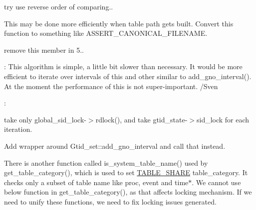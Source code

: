 \begin{DoxyRefList}
try use reverse order of comparing.. 
\item[\label{todo__todo000020}%
\Hypertarget{todo__todo000020}%
Member \mbox{\hyperlink{handler_8cc_ad012444cc24f2178ff92e9e7ecbfbc85}{get\+\_\+canonical\+\_\+filename}} (handler $\ast$file, const char $\ast$path, char $\ast$tmp\+\_\+path)]This may be done more efficiently when table path gets built. Convert this function to something like A\+S\+S\+E\+R\+T\+\_\+\+C\+A\+N\+O\+N\+I\+C\+A\+L\+\_\+\+F\+I\+L\+E\+N\+A\+ME.  
\item[\label{todo__todo000130}%
\Hypertarget{todo__todo000130}%
Member \mbox{\hyperlink{structGRANT__INFO_afb32946497f7754ba60914d9fca5d616}{G\+R\+A\+N\+T\+\_\+\+I\+N\+FO\+:\+:want\+\_\+privilege}} ]remove this member in 5..  
\item[\label{todo__todo000060}%
\Hypertarget{todo__todo000060}%
Member \mbox{\hyperlink{classGtid__set_a9a384be7c735d018d5fc0c8c0c64344e}{Gtid\+\_\+set\+:\+:intersection}} (const \mbox{\hyperlink{classGtid__set}{Gtid\+\_\+set}} $\ast$other, \mbox{\hyperlink{classGtid__set}{Gtid\+\_\+set}} $\ast$result)]\+: This algorithm is simple, a little bit slower than necessary. It would be more efficient to iterate over intervals of \textquotesingle{}this\textquotesingle{} and \textquotesingle{}other\textquotesingle{} similar to add\+\_\+gno\+\_\+interval(). At the moment the performance of this is not super-\/important. /\+Sven  
\item[\label{todo__todo000059}%
\Hypertarget{todo__todo000059}%
Member \mbox{\hyperlink{classGtid__table__persistor_aeea3284db6daf718fa412a70e4afb889}{Gtid\+\_\+table\+\_\+persistor\+:\+:fetch\+\_\+gtids}} (\mbox{\hyperlink{classGtid__set}{Gtid\+\_\+set}} $\ast$gtid\+\_\+set)]\+:
\begin{DoxyItemize}
\item take only global\+\_\+sid\+\_\+lock-\/$>$rdlock(), and take gtid\+\_\+state-\/$>$sid\+\_\+lock for each iteration.
\item Add wrapper around Gtid\+\_\+set\+::add\+\_\+gno\+\_\+interval and call that instead.  
\end{DoxyItemize}
\item[\label{todo__todo000022}%
\Hypertarget{todo__todo000022}%
Member \mbox{\hyperlink{handler_8cc_a4b52399a74d9db4f3421851b46ff6dc9}{ha\+\_\+check\+\_\+if\+\_\+supported\+\_\+system\+\_\+table}} (handlerton $\ast$hton, const char $\ast$db, const char $\ast$table\+\_\+name)]There is another function called is\+\_\+system\+\_\+table\+\_\+name() used by get\+\_\+table\+\_\+category(), which is used to set \mbox{\hyperlink{structTABLE__SHARE}{T\+A\+B\+L\+E\+\_\+\+S\+H\+A\+RE}} table\+\_\+category. It checks only a subset of table name like proc, event and time$\ast$. We cannot use below function in get\+\_\+table\+\_\+category(), as that affects locking mechanism. If we need to unify these functions, we need to fix locking issues generated. 

\end{DoxyRefList}
